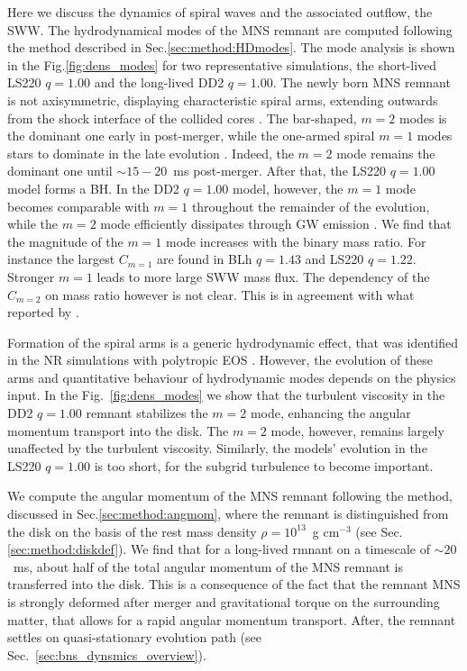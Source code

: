 \documentclass[11pt,a4paper,headinclude=true,DIV=14,BCOR=8mm,chapterprefix,listof=totoc,twoside,openright,abstracton]{scrbook}
\newcommand{\gcm}{g cm$^{-3}$}
\newcommand{\pmerg}{post-merger}
\newcommand{\mr}{mass ratio}
\begin{document}
Here we discuss the dynamics of spiral waves and the associated outflow, the \ac{SWW}.
The hydrodynamical modes of the \ac{MNS} remnant are computed following the 
method described in Sec.\ref{sec:method:HDmodes}. 
The mode analysis is shown in the Fig.\ref{fig:dens_modes} for two representative 
simulations, the short-lived LS220 $q=1.00$ and the long-lived DD2 $q=1.00$.
The newly born \ac{MNS} remnant is not axisymmetric, displaying characteristic 
spiral arms, extending outwards from the shock interface of the collided cores 
\citep{Shibata:1999wm,Shibata:2006nm,Bernuzzi:2013rza,Kastaun:2014fna,East:2015vix,Paschalidis:2015mla,Radice:2016gym,Lehner:2016wjg}.
The bar-shaped, $m=2$ modes is the dominant one early in \pmerg{}, while the 
one-armed spiral $m=1$ modes stars to dominate in the late evolution 
\citep{East:2015vix,Paschalidis:2015mla,Radice:2016gym,Lehner:2016wjg,Bernuzzi:2013rza,Kastaun:2014fna}.
Indeed, the $m=2$ mode remains the dominant one until $\sim15-20$~ms \pmerg{}. 
After that, the LS220 $q=1.00$ model forms a \ac{BH}. 
In the DD2 $q=1.00$ model, however, the $m=1$ mode becomes comparable with $m=1$ 
throughout the remainder of the evolution, while the $m=2$ mode efficiently dissipates 
through \ac{GW} emission \citep{Bernuzzi:2015opx,Radice:2016gym}.
We find that the magnitude of the $m=1$ mode increases with the binary \mr{}.
For instance the largest $C_{m=1}$ are found in BLh $q=1.43$ and LS220 $q=1.22$.
Stronger $m=1$ leads to more large \ac{SWW} mass flux.
The dependency of the $C_{m=2}$ on \mr{} however is not clear. 
This is in agreement with what reported by \citet{Lehner:2016wjg}.

Formation of the spiral arms is a generic hydrodynamic effect, that was identified 
in the \ac{NR} simulations with polytropic \ac{EOS} 
\citep{Bernuzzi:2013rza,Radice:2016gym}.
However, the evolution of these arms and quantitative behaviour of hydrodynamic
modes depends on the physics input. 
In the Fig.~\ref{fig:dens_modes} we show that the turbulent viscosity in the 
DD2 $q=1.00$ remnant stabilizes the $m=2$ mode, enhancing the angular momentum 
transport into the disk.
The $m=2$ mode, however, remains largely unaffected by the turbulent viscosity.
Similarly, the models' evolution in the LS220 $q=1.00$ is too short, for the 
subgrid turbulence to become important.

We compute the angular momentum of the \ac{MNS} remnant following the method,
discussed in Sec.\ref{sec:method:angmom}, where the remnant is distinguished 
from the disk on the basis of the rest mass density $\rho=10^{13}$~\gcm{} 
(see Sec.\ref{sec:method:diskdef}).
We find that for a long-lived rmnant 
on a timescale of $\sim20$~ms, about half of the total angular momentum 
of the \ac{MNS} remnant is transferred into the disk. 
This is a consequence of the fact that the remnant \ac{MNS} is strongly deformed 
after merger and gravitational torque on the surrounding matter, 
that allows for a rapid angular momentum transport.
After, the remnant settles on quasi-stationary evolution path 
(see Sec.~\ref{sec:bns_dynsmics_overview}).
\end{document}
